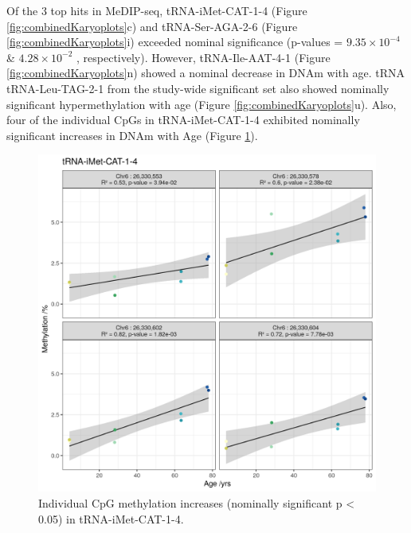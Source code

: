 \documentclass[
]{book}
\begin{document}
Of the 3 top hits in MeDIP-seq, tRNA-iMet-CAT-1-4 (Figure \ref{fig:combinedKaryoplots}c) and tRNA-Ser-AGA-2-6 (Figure \ref{fig:combinedKaryoplots}i) exceeded nominal significance (p-values = \(9.35\times10^{-4}\) \& \(4.28\times10^{-2}\) , respectively).
However, tRNA-Ile-AAT-4-1 (Figure \ref{fig:combinedKaryoplots}n) showed a nominal decrease in DNAm with age.
tRNA tRNA-Leu-TAG-2-1 from the study-wide significant set also showed nominally significant hypermethylation with age (Figure \ref{fig:combinedKaryoplots}u).
Also, four of the individual CpGs in tRNA-iMet-CAT-1-4 exhibited nominally significant increases in DNAm with Age (Figure \ref{fig:tRNAiMetCAT1x4nomSigCpG}).

\begin{figure}

{\centering \includegraphics[width=0.8\linewidth]{./figs/tRNA-iMet-CAT-1-4_nomSig_CpG} 

}

\caption{Individual CpG methylation increases (nominally significant p \textless{} 0.05) in tRNA-iMet-CAT-1-4.}\label{fig:tRNAiMetCAT1x4nomSigCpG}
\end{figure}
\end{document}
